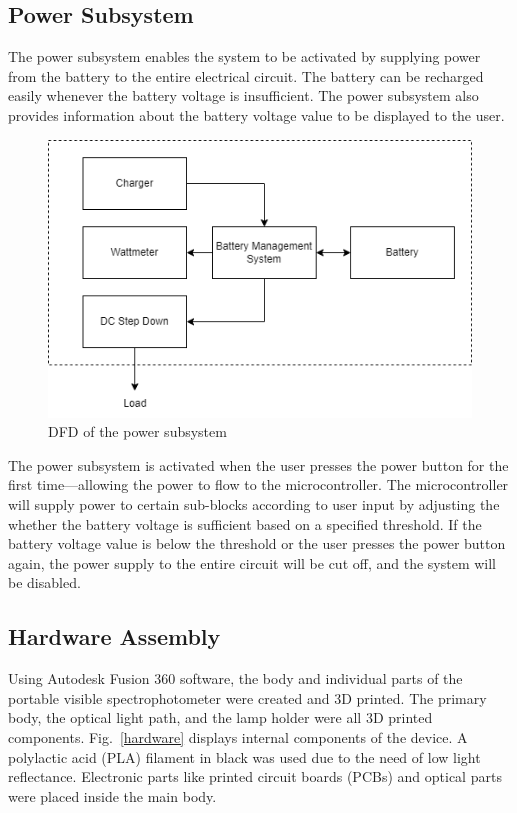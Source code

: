 \documentclass[conference]{IEEEtran}
\begin{document}
\subsection{Power Subsystem}
The power subsystem enables the system to be activated by supplying power from the battery to the entire electrical circuit. The battery can be recharged easily whenever the battery voltage is insufficient. The power subsystem also provides information about the battery voltage value to be displayed to the user. 

    \begin{figure}[htbp]
    \centerline{\includegraphics[scale=0.5]{power-dfd.png}}
    \caption{DFD of the power subsystem}
    \label{power-dfd}
    \end{figure}

The power subsystem is activated when the user presses the power button for the first time—allowing the power to flow to the microcontroller. The microcontroller will supply power to certain sub-blocks according to user input by adjusting the whether the battery voltage is sufficient based on a specified threshold. If the battery voltage value is below the threshold or the user presses the power button again, the power supply to the entire circuit will be cut off, and the system will be disabled.

\subsection{Hardware Assembly}
Using Autodesk Fusion 360 software, the body and individual parts of the portable visible spectrophotometer were created and 3D printed.
The primary body, the optical light path, and the lamp holder were all 3D printed components.
Fig.~\ref{hardware} displays internal components of the device.
A polylactic acid (PLA) filament in black was used due to the need of low light reflectance.
Electronic parts like printed circuit boards (PCBs) and optical parts were placed inside the main body.
\end{document}
